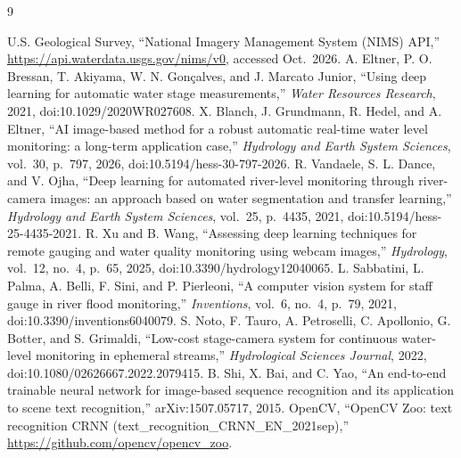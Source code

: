 \documentclass[conference,10pt,letterpaper]{IEEEtran}
\begin{document}
\begin{thebibliography}{9}\raggedright
{} U.S. Geological Survey, ``National Imagery Management System (NIMS) API,'' \url{https://api.waterdata.usgs.gov/nims/v0}, accessed Oct.~2026.
 A. Eltner, P. O. Bressan, T. Akiyama, W. N. Gon\c{c}alves, and J. Marcato Junior, ``Using deep learning for automatic water stage measurements,'' \emph{Water Resources Research}, 2021, doi:10.1029/2020WR027608.
 X. Blanch, J. Grundmann, R. Hedel, and A. Eltner, ``AI image-based method for a robust automatic real-time water level monitoring: a long-term application case,'' \emph{Hydrology and Earth System Sciences}, vol.~30, p.~797, 2026, doi:10.5194/hess-30-797-2026.
 R. Vandaele, S. L. Dance, and V. Ojha, ``Deep learning for automated river-level monitoring through river-camera images: an approach based on water segmentation and transfer learning,'' \emph{Hydrology and Earth System Sciences}, vol.~25, p.~4435, 2021, doi:10.5194/hess-25-4435-2021.
 R. Xu and B. Wang, ``Assessing deep learning techniques for remote gauging and water quality monitoring using webcam images,'' \emph{Hydrology}, vol.~12, no.~4, p.~65, 2025, doi:10.3390/hydrology12040065.
 L. Sabbatini, L. Palma, A. Belli, F. Sini, and P. Pierleoni, ``A computer vision system for staff gauge in river flood monitoring,'' \emph{Inventions}, vol.~6, no.~4, p.~79, 2021, doi:10.3390/inventions6040079.
 S. Noto, F. Tauro, A. Petroselli, C. Apollonio, G. Botter, and S. Grimaldi, ``Low-cost stage-camera system for continuous water-level monitoring in ephemeral streams,'' \emph{Hydrological Sciences Journal}, 2022, doi:10.1080/02626667.2022.2079415.
 B. Shi, X. Bai, and C. Yao, ``An end-to-end trainable neural network for image-based sequence recognition and its application to scene text recognition,'' arXiv:1507.05717, 2015.
 OpenCV, ``OpenCV Zoo: text recognition CRNN (text\_recognition\_CRNN\_EN\_2021sep),'' \url{https://github.com/opencv/opencv_zoo}.
\end{thebibliography}
\end{document}
